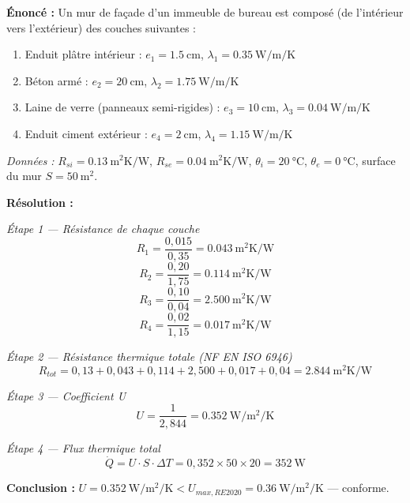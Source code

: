 \begin{exemple}[title=Calcul de perte thermique par une paroi multicouche]

\textbf{Énoncé :} Un mur de façade d'un immeuble de bureau est composé (de l'intérieur vers
l'extérieur) des couches suivantes :
\begin{enumerate}
  \item Enduit plâtre intérieur : \(e_1 = \SI{1,5}{\centi\meter}\), \(\lambda_1 = \SI{0,35}{\watt\per\meter\per\kelvin}\)
  \item Béton armé : \(e_2 = \SI{20}{\centi\meter}\), \(\lambda_2 = \SI{1,75}{\watt\per\meter\per\kelvin}\)
  \item Laine de verre (panneaux semi-rigides) : \(e_3 = \SI{10}{\centi\meter}\), \(\lambda_3 = \SI{0,04}{\watt\per\meter\per\kelvin}\)
  \item Enduit ciment extérieur : \(e_4 = \SI{2}{\centi\meter}\), \(\lambda_4 = \SI{1,15}{\watt\per\meter\per\kelvin}\)
\end{enumerate}

\textit{Données :} \(R_{si} = \SI{0,13}{\meter\squared\kelvin\per\watt}\),
\(R_{se} = \SI{0,04}{\meter\squared\kelvin\per\watt}\), $\theta_i = \SI{20}{\degreeCelsius}$, $\theta_e = \SI{0}{\degreeCelsius}$, surface du mur $S = \SI{50}{\meter\squared}$.

\textbf{Résolution :}

\textit{Étape 1 — Résistance de chaque couche}
\[
  R_1 = \frac{0{,}015}{0{,}35} = \SI{0,043}{\meter\squared\kelvin\per\watt}
\]
\[
  R_2 = \frac{0{,}20}{1{,}75} = \SI{0,114}{\meter\squared\kelvin\per\watt}
\]
\[
  R_3 = \frac{0{,}10}{0{,}04} = \SI{2,500}{\meter\squared\kelvin\per\watt}
\]
\[
  R_4 = \frac{0{,}02}{1{,}15} = \SI{0,017}{\meter\squared\kelvin\per\watt}
\]

\textit{Étape 2 — Résistance thermique totale (NF EN ISO 6946)}
\[
  R_{tot} = 0{,}13 + 0{,}043 + 0{,}114 + 2{,}500 + 0{,}017 + 0{,}04
  = \boxed{\SI{2,844}{\meter\squared\kelvin\per\watt}}
\]

\textit{Étape 3 — Coefficient U}
\[
  U = \frac{1}{2{,}844} = \SI{0,352}{\watt\per\meter\squared\per\kelvin}
\]

\textit{Étape 4 — Flux thermique total}
\[
  \dot{Q} = U \cdot S \cdot \Delta T = 0{,}352 \times 50 \times 20 = \boxed{\SI{352}{\watt}}
\]

\textbf{Conclusion :} $U = \SI{0,352}{\watt\per\meter\squared\per\kelvin} < U_{max,RE2020} = \SI{0,36}{\watt\per\meter\squared\per\kelvin}$ — conforme.
\end{exemple}

